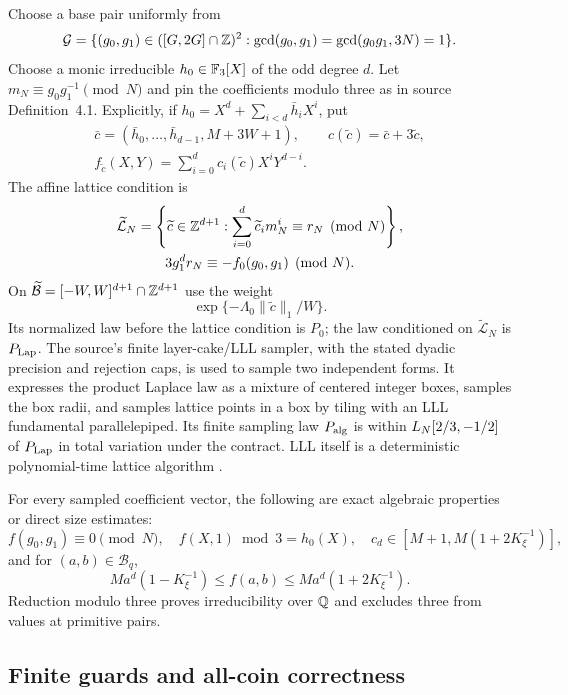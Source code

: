 Choose a base pair uniformly from
\[
 \mathcal G=\{(g_0,g_1)\in([G,2G]\cap\mathbb Z)^2:
       \gcd(g_0,g_1)=\gcd(g_0g_1,3N)=1\}.
\]
Choose a monic irreducible $h_0\in\mathbb F_3[X]$ of the odd degree $d$.
Let $m_N\equiv g_0g_1^{-1}\pmod N$ and pin the coefficients modulo
three as in source Definition~4.1.  Explicitly, if
$h_0=X^d+\sum_{i<d}\bar h_iX^i$, put
\begin{gather*}
 \bar c=(\bar h_0,\ldots,\bar h_{d-1},M+3W+1),\qquad
 c(\widetilde c)=\bar c+3\widetilde c,\\
 f_{\widetilde c}(X,Y)=\sum_{i=0}^d c_i(\widetilde c)X^iY^{d-i}.
\end{gather*}
The affine lattice condition is
\begin{gather*}
 \widetilde{\mathcal L}_N=
 \left\{\widetilde c\in\mathbb Z^{d+1}:
       \sum_{i=0}^d\widetilde c_i m_N^i\equiv r_N\pmod N\right\},\\
 3g_1^dr_N\equiv-f_0(g_0,g_1)\pmod N.
\end{gather*}
On $\widetilde{\mathcal B}=[-W,W]^{d+1}\cap\mathbb Z^{d+1}$ use the
weight
\[
 \exp\{-\Lambda_0\|\widetilde c\|_1/W\}.
\]
Its normalized law before the lattice condition is $P_0$; the law
conditioned on $\widetilde{\mathcal L}_N$ is $P_{\rm Lap}$.
The source's finite layer-cake/LLL sampler, with the stated dyadic
precision and rejection caps, is used to sample two independent
forms.  It expresses the product Laplace law as a mixture of centered
integer boxes, samples the box radii, and samples lattice points in a
box by tiling with an LLL fundamental parallelepiped.  Its finite
sampling law $P_{\rm alg}$ is within $L_N[2/3,-1/2]$ of $P_{\rm Lap}$
in total variation under the contract.  LLL itself is a deterministic
polynomial-time lattice algorithm \cite{LLL1982}.

For every sampled coefficient vector, the following are exact
algebraic properties or direct size estimates:
\[
 f(g_0,g_1)\equiv0\pmod N,\quad
 f(X,1)\bmod3=h_0(X),\quad
 c_d\in[M+1,M(1+2K_\xi^{-1})],
\]
and for $(a,b)\in\mathcal B_q$,
\begin{equation}
 Ma^d(1-K_\xi^{-1})\le f(a,b)
                   \le Ma^d(1+2K_\xi^{-1}).
 \label{rf:normsize}
\end{equation}
Reduction modulo three proves irreducibility over $\mathbb Q$ and excludes
three from values at primitive pairs.

\subsection{Finite guards and all-coin correctness}

